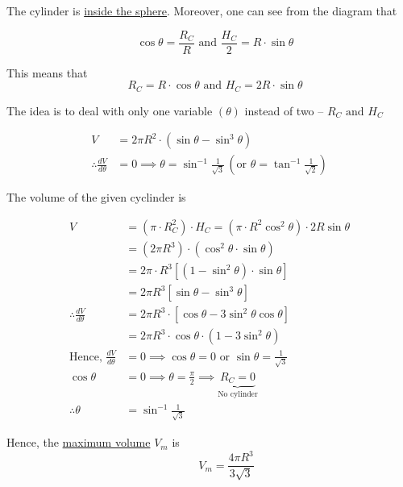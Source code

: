 \documentclass[14pt,fleqn]{extarticle}
\begin{document}
\newcard

The cylinder is \underline{inside the sphere}. Moreover, one can see from the diagram that 

\[ \quad \cos\theta = \frac{R_C}{R} \text{ and } \frac{H_C}{2} = R\cdot \sin\theta \]

This means that 
\[ \quad R_C = R\cdot\cos\theta \text{ and } H_C = 2R\cdot\sin\theta \]

The idea is to deal with only one variable $(\theta)$ instead of two -- $R_C\text{ and } H_C$ 

\newcard 

\begin{align}
	V &= 2\pi R^2\cdot \left(\sin\theta - \sin^3\theta \right) \\
	\therefore \frac{dV}{d\theta} &= 0\implies\theta = \sin^{-1}\frac{1}{\sqrt{3}} \,\left(\text{or }\theta = \tan^{-1}\frac{1}{\sqrt{2}} \right)
\end{align}

\newcard 

The volume of the given cyclinder is 

\begin{align}
	V &= \left(\pi\cdot R_C^2 \right)\cdot H_C = \left(\pi\cdot R^2\cos^2\theta \right)\cdot 2R\sin\theta \\
	&= \left(2\pi R^3 \right)\cdot \left(\cos^2\theta\cdot \sin\theta \right) \\	
	&= 2\pi\cdot R^3 \left[\left(1-\sin^2\theta \right)\cdot \sin\theta \right] \\
	&= 2\pi R^3 \left[\sin\theta-\sin^3\theta \right] \\
	\therefore \frac{dV}{d\theta} &= 2\pi R^3\cdot \left[\cos\theta - 3\sin^2\theta\cos\theta \right] \\
	&= 2\pi R^3\cdot\cos\theta\cdot \left(1-3\sin^2\theta \right) \\
	\text{Hence, } \frac{dV}{d\theta} &= 0 \implies \cos\theta = 0\text{ or } \sin\theta = \frac{1}{\sqrt{3}} \\
	\cos\theta &= 0 \implies \theta = \frac\pi{2}\implies \underbrace{R_C = 0}_{\text{No cylinder}}\\
	\therefore \theta &= \sin^{-1}\frac{1}{\sqrt{3}} 
\end{align}

\newcard

Hence, the \underline{maximum volume} $V_m$ is 
\[ \quad \qquad V_m = \frac{4\pi R^3}{3\sqrt{3}} \] 

\newcard 
\end{document}
